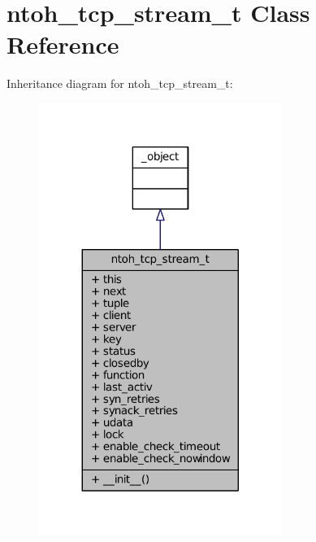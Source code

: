 \hypertarget{classlibntoh_1_1ntoh__tcp__stream__t}{\section{ntoh\-\_\-tcp\-\_\-stream\-\_\-t Class Reference}
\label{classlibntoh_1_1ntoh__tcp__stream__t}
}


Inheritance diagram for ntoh\-\_\-tcp\-\_\-stream\-\_\-t\-:
\nopagebreak
\begin{figure}[H]
\begin{center}
\leavevmode
\includegraphics[width=224pt]{classlibntoh_1_1ntoh__tcp__stream__t__inherit__graph}
\end{center}
\end{figure}


